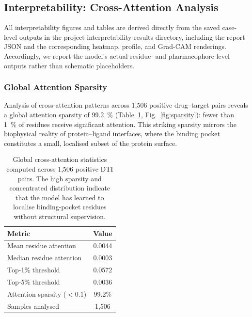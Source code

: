 \documentclass[fleqn,10pt]{wlscirep}
\begin{document}
\FloatBarrier

\subsection{Interpretability: Cross-Attention Analysis}
\label{sec:interpretability}

All interpretability figures and tables are derived directly from the saved
case-level outputs in the project interpretability-results directory, including
the report JSON and the corresponding heatmap, profile, and Grad-CAM renderings.
Accordingly, we report the model's actual residue- and pharmacophore-level
outputs rather than schematic placeholders.

\subsubsection{Global Attention Sparsity}

Analysis of cross-attention patterns across 1{,}506 positive drug--target pairs
reveals a global attention sparsity of \SI{99.2}{\percent}
(Table~\ref{tab:global_attn}, Fig.~\ref{fig:sparsity}): fewer than
\SI{1}{\percent} of residues receive significant attention.  This striking
sparsity mirrors the biophysical reality of protein--ligand interfaces, where the
binding pocket constitutes a small, localised subset of the protein
surface.\cite{laskowski1995surfnet}

\begin{table}[htbp]
\centering
\caption{Global cross-attention statistics computed across 1{,}506 positive DTI
  pairs.  The high sparsity and concentrated distribution indicate that the
  model has learned to localise binding-pocket residues without structural
  supervision.}
\label{tab:global_attn}
\begin{tabular}{lc}
\toprule
\textbf{Metric} & \textbf{Value} \\
\midrule
Mean residue attention      & 0.0044 \\
Median residue attention    & 0.0003 \\
Top-1\% threshold           & 0.0572 \\
Top-5\% threshold           & 0.0036 \\
Attention sparsity ($<0.1$) & 99.2\% \\
Samples analysed            & 1{,}506 \\
\bottomrule
\end{tabular}
\end{table}
\end{document}
